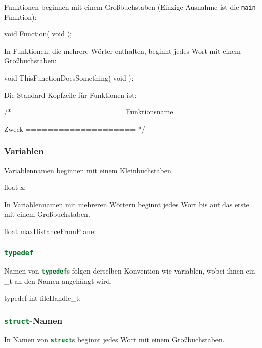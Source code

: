 \documentclass{homework-pp}
\renewcommand{\c}[1]{\lstinline[language=c,basicstyle=\ttfamily]|#1|}
\begin{document}
Funktionen beginnen mit einem Großbuchstaben (Einzige Ausnahme ist die \c{main}-Funktion):

\begin{cblock}
void Function( void );
\end{cblock}

In Funktionen, die mehrere Wörter enthalten, beginnt jedes Wort mit einem Großbuchstaben:

\begin{cblock}
void ThisFunctionDoesSomething( void );
\end{cblock}

Die Standard-Kopfzeile für Funktionen ist:

\begin{cblock}
/*
====================
Funktionsname

Zweck
====================
*/
\end{cblock}

\subsubsection{Variablen}

Variablennamen beginnen mit einem Kleinbuchstaben.

\begin{cblock}
float x;
\end{cblock}

In Variablennamen mit mehreren Wörtern beginnt jedes Wort bis auf das erste mit einem Großbuchstaben.

\begin{cblock}
float maxDistanceFromPlane;
\end{cblock}

\subsubsection{\c{typedef}}

Namen von \c{typedef}s folgen derselben Konvention wie variablen, wobei ihnen ein \_t an den Namen angehängt wird.

\begin{cblock}
typedef int fileHandle_t;
\end{cblock}

\subsubsection{\c{struct}-Namen}

In Namen von \c{struct}s beginnt jedes Wort mit einem Großbuchstaben.
\end{document}
